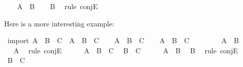 \begin{isabellebody}
%
\isadelimproof
%
\endisadelimproof
%
\isatagproof
{}\isamarkupfalse%
\isanewline
\ \ \isamarkupfalse%
\ {\isachardoublequoteopen}A\ {\isasymand}\ B{\isachardoublequoteclose}\isanewline
\ \ \isamarkupfalse%
\ {\isachardoublequoteopen}B{\isachardoublequoteclose}\ \isamarkupfalse%
\ {\isacharparenleft}rule\ conjE{\isacharparenright}\isanewline
{}\isamarkupfalse%
%
\endisatagproof
{\isafoldproof}%
%
\isadelimproof
%
\endisadelimproof
%
\begin{isamarkuptext}%
Here is a more interesting example:%
\end{isamarkuptext}\isamarkuptrue%
\isamarkupfalse%
\ import{\isacharcolon}\ {\isachardoublequoteopen}{\isacharparenleft}A\ {\isasymlongrightarrow}\ B\ {\isasymlongrightarrow}\ C{\isacharparenright}\ {\isasymlongrightarrow}\ {\isacharparenleft}A\ {\isasymand}\ B\ {\isasymlongrightarrow}\ C{\isacharparenright}{\isachardoublequoteclose}\isanewline
%
\isadelimproof
%
\endisadelimproof
%
\isatagproof
{}\isamarkupfalse%
\isanewline
\ \ \isamarkupfalse%
\ {\isachardoublequoteopen}A\ {\isasymlongrightarrow}\ B\ {\isasymlongrightarrow}\ C{\isachardoublequoteclose}\isanewline
\ \ \isamarkupfalse%
\ {\isachardoublequoteopen}A\ {\isasymand}\ B\ {\isasymlongrightarrow}\ C{\isachardoublequoteclose}\isanewline
\ \ \isamarkupfalse%
\isanewline
\ \ \ \ \isamarkupfalse%
\ {\isachardoublequoteopen}A\ {\isasymand}\ B{\isachardoublequoteclose}\isanewline
\ \ \ \ \isamarkupfalse%
\ \isamarkupfalse%
\ {\isachardoublequoteopen}A{\isachardoublequoteclose}\ \isamarkupfalse%
\ {\isacharparenleft}rule\ conjE{\isacharparenright}\isanewline
\ \ \ \ \isamarkupfalse%
\ {\isacharbackquoteopen}A\ {\isasymlongrightarrow}\ B\ {\isasymlongrightarrow}\ C{\isacharbackquoteclose}\ \isamarkupfalse%
\ {\isachardoublequoteopen}B\ {\isasymlongrightarrow}\ C{\isachardoublequoteclose}\isacommand{{\isachardot}{\isachardot}}\isamarkupfalse%
\isanewline
\ \ \ \ \isamarkupfalse%
\ {\isacharbackquoteopen}A\ {\isasymand}\ B{\isacharbackquoteclose}\ \isamarkupfalse%
\ {\isachardoublequoteopen}B{\isachardoublequoteclose}\ \isamarkupfalse%
\ {\isacharparenleft}rule\ conjE{\isacharparenright}\isanewline
\ \ \ \ \isamarkupfalse%
\ {\isacharbackquoteopen}B\ {\isasymlongrightarrow}\ C{\isacharbackquoteclose}\ \isamarkupfalse%

\end{isabellebody}
